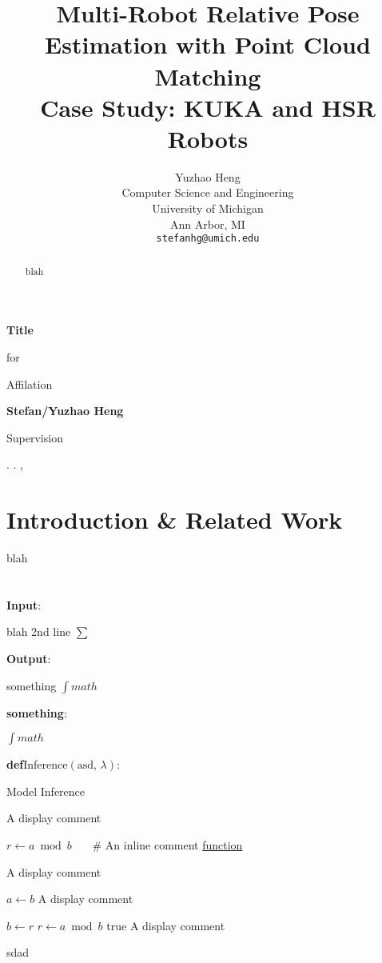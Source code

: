 \documentclass[10pt]{article}
\title{Multi-Robot Relative Pose Estimation with Point Cloud Matching \\ Case Study: KUKA and HSR Robots}
\author{
    Yuzhao Heng \\
    Computer Science and Engineering \\
    University of Michigan \\
    Ann Arbor, MI \\
    \texttt{stefanhg@umich.edu}
}
\makeatletter
\newcommand{\mydate}{\shortdayofweekname{\day}{\month}{\year}. \shortmonthname. \nth{\day}, \the\year{}}
\newcommand{\paren}[1]{\left(#1\right)}
\newcommand{\defMy}[2]{\vspace{0.25em}\textcolor{code_io}{\textbf{def}}\hspace{0.5em}#1$\displaystyle \paren{\text{#2}}$:\par\vspace{0.25em}}
\def\Com#1{{\def\alglinenumber##1{\textcolor{code_comment}{\#}}\State \textcolor{code_comment}{#1}\vspace{0.125em}}\addtocounter{ALG@line}{-1}}
\def\ComT#1{{\def\alglinenumber##1{\textcolor{code_comment}{\#}}\item \textcolor{code_comment}{#1}\vspace{0.125em}}\addtocounter{ALG@line}{-1}}
\newcommand{\comIn}[1]{\textcolor{code_comment}{~~~\# #1}}
\newcommand{\kwPair}[2]{\vspace{0.25em}\hspace{1em}\textbf{#1}: \begin{minipage}[t]{\linewidth-\widthof{\textbf{#1}-1em}}#2\end{minipage} \par \vspace{0.25em}}
\makeatother
\begin{document}
\begin{titlepage}
    \begin{center}
        \vspace*{3cm}

        \Huge
        \textbf{Title} \par
        \vspace{0.5cm}

        \LARGE
        for \par
        Affilation
        \vspace{1.5cm}

        \textbf{Stefan/Yuzhao Heng}
        \vfill

        \large
        Supervision \par
        \vspace{0.8cm}

        \mydate \vspace{0.5cm}
        \vspace{0.8cm}
    \end{center}
\end{titlepage}
\maketitle


\thispagestyle{titlepage}
\begin{abstract}
    blah
\end{abstract}

\section{Introduction \& Related Work}
blah

\citealp{Wasik:16}


\section{}
\begin{algorithm}
    \kwPair{Input}{blah \newline 2nd line \newline $\displaystyle \sum$}
    \kwPair{Output}{something \newline $\displaystyle \int math$}
    \kwPair{something}{$\displaystyle \int math$}
    \defMy{Inference}{asd, $\lambda$}
    \caption{Model Inference}
    \begin{algorithmic}[1]
        \ComT{A display comment}
        \State $r\gets a\bmod b$ \comIn{An inline comment}
        \State \hyperref[alg:func]{function}
        \ComT{A display comment}
            \State
        \EndFor
         
            \State $a\gets b$
            \Com{A display comment}
            \State $b\gets r$
            \State $r\gets a\bmod b$ \AND true
            \Com{A display comment}
        \EndWhile\label{euclidendwhile}
        \RETURN{} sdad 
    \end{algorithmic}
\end{algorithm}
\end{document}
